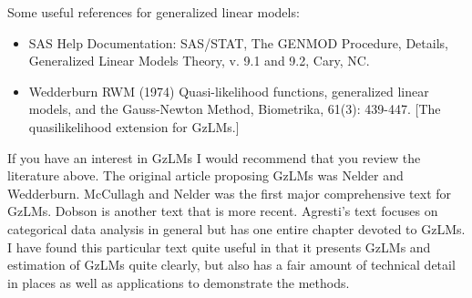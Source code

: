 \documentclass[
  9pt,
  ignorenonframetext,
]{beamer}
\begin{document}
\begin{frame}{Some useful references for generalized linear models:}
\protect\hypertarget{some-useful-references-for-generalized-linear-models-1}{}
\begin{itemize}
\item
  SAS Help Documentation: SAS/STAT, The GENMOD Procedure, Details,
  Generalized Linear Models Theory, v. 9.1 and 9.2, Cary, NC.
\item
  Wedderburn RWM (1974) Quasi-likelihood functions, generalized linear
  models, and the Gauss-Newton Method, Biometrika, 61(3): 439-447.
  {[}The quasilikelihood extension for GzLMs.{]}
\end{itemize}

If you have an interest in GzLMs I would recommend that you review the
literature above. The original article proposing GzLMs was Nelder and
Wedderburn. McCullagh and Nelder was the first major comprehensive text
for GzLMs. Dobson is another text that is more recent. Agresti's text
focuses on categorical data analysis in general but has one entire
chapter devoted to GzLMs. I have found this particular text quite useful
in that it presents GzLMs and estimation of GzLMs quite clearly, but
also has a fair amount of technical detail in places as well as
applications to demonstrate the methods.
\end{frame}
\end{document}
